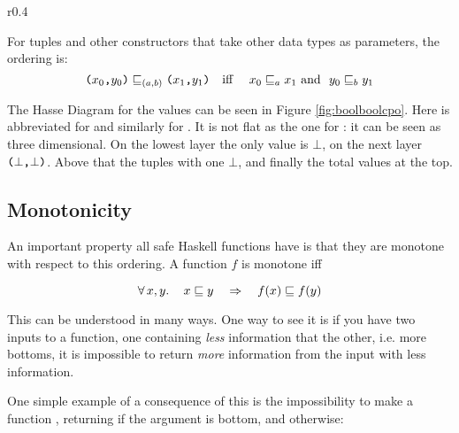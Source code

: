 \begin{wrapfigure}[25]{r}{0.4\textwidth} %
\begin{center}
\vspace{-12pt}

\caption{
    \texttt{(Bool,Bool)} partial order.
    \label{fig:boolboolcpo}
}
\end{center}
\end{wrapfigure} %
For tuples and other constructors that take other data types as
parameters, the ordering is:
\begin{equation*}
\hstup{x_0}{y_0} \sqsubseteq_{(a,b)} \hstup{x_1}{y_1} \text{\quad iff \quad}
x_0 \sqsubseteq_a x_1 \text{\w and \w} y_0 \sqsubseteq_b y_1
\end{equation*}

The Hasse Diagram for the  values can be seen in
Figure \ref{fig:boolboolcpo}. Here  is abbreviated for 
and similarly for . It is not flat as the one for :
it can be seen as three dimensional. On the lowest layer the only
value is $\bot$, on the next layer $\hstup{\bot}{\bot}$. Above that
the tuples with one $\bot$, and finally the total values at the
top.

\vspace{30pt}

\subsection{Monotonicity}
 An important property all safe Haskell functions have is that they are
monotone with respect to this ordering. A function $f$ is monotone iff

\begin{equation*}
\forall \, x , y . \, \quad x \sqsubseteq y \quad \Rightarrow \quad f(x) \sqsubseteq f(y)
\end{equation*}

This can be understood in many ways. One way to see it is if you have
two inputs to a function, one containing \emph{less} information that
the other, i.e. more bottoms, it is impossible to return \emph{more}
information from the input with less information.

One simple example of a consequence of this is the impossibility to
make a function , returning  if the
argument is bottom, and  otherwise:

